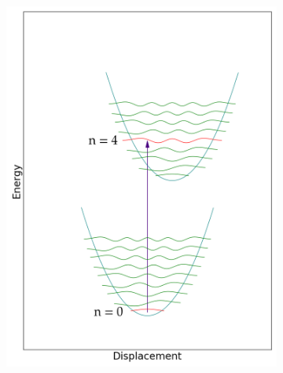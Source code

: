 \documentclass[12pt, fleqn]{beamer}
\begin{document}
\begin{frame}
\begin{overlayarea}{\textwidth}{14cm}
{\begin{figure}[h!]
\begin{subfigure}[b]{0.45\linewidth}
                    \includegraphics[width=\linewidth]{fc/tr_4.png}
                \end{subfigure}
                \begin{subfigure}[b]{0.45\linewidth}

\end{subfigure}
\end{figure}}
\end{overlayarea}
\end{frame}
\end{document}
